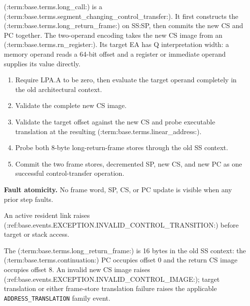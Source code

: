 (:term:base.terms.long_call:) is a (:term:base.terms.segment_changing_control_transfer:). It first constructs the (:term:base.terms.long_return_frame:) on SS:SP, then commits the new CS and PC together. The two-operand encoding takes the new CS image from an (:term:base.terms.rn_register:). Its target EA has Q interpretation width: a memory operand reads a 64-bit offset and a register or immediate operand supplies its value directly.

\begin{enumerate}
\item Require LPA.A to be zero, then evaluate the target operand completely in the old architectural context.
\item Validate the complete new CS image.
\item Validate the target offset against the new CS and probe executable translation at the resulting (:term:base.terms.linear_address:).
\item Probe both 8-byte long-return-frame stores through the old SS context.
\item Commit the two frame stores, decremented SP, new CS, and new PC as one successful control-transfer operation.
\end{enumerate}

\textbf{Fault atomicity.} No frame word, SP, CS, or PC update is visible when any prior step faults.

An active resident link raises (:ref:base.events.EXCEPTION.INVALID_CONTROL_TRANSITION:) before target or stack access.

The (:term:base.terms.long_return_frame:) is 16 bytes in the old SS context: the (:term:base.terms.continuation:) PC occupies offset 0 and the return CS image
occupies offset 8. An invalid new CS image raises (:ref:base.events.EXCEPTION.INVALID_CONTROL_IMAGE:); target translation or either
frame-store translation failure raises the applicable \texttt{ADDRESS\_TRANSLATION} family event.
